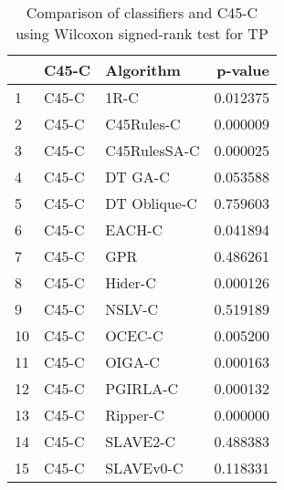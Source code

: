 \begin{table}
\footnotesize
\caption{Comparison of classifiers and C45-C using Wilcoxon signed-rank test for TP}
\label{tab:C45-C wilcoxon TP comparison}
\begin{tabular}{lllr}
\hline
 & C45-C & Algorithm & p-value \\
\hline
1 & C45-C & 1R-C & 0.012375 \\
2 & C45-C & C45Rules-C & 0.000009 \\
3 & C45-C & C45RulesSA-C & 0.000025 \\
4 & C45-C & DT GA-C & 0.053588 \\
5 & C45-C & DT Oblique-C & 0.759603 \\
6 & C45-C & EACH-C & 0.041894 \\
7 & C45-C & GPR & 0.486261 \\
8 & C45-C & Hider-C & 0.000126 \\
9 & C45-C & NSLV-C & 0.519189 \\
10 & C45-C & OCEC-C & 0.005200 \\
11 & C45-C & OIGA-C & 0.000163 \\
12 & C45-C & PGIRLA-C & 0.000132 \\
13 & C45-C & Ripper-C & 0.000000 \\
14 & C45-C & SLAVE2-C & 0.488383 \\
15 & C45-C & SLAVEv0-C & 0.118331 \\
\hline
\end{tabular}
\end{table}
